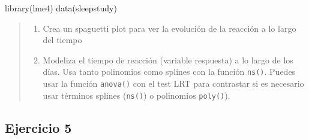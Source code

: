 \documentclass[
]{book}
\newenvironment{Shaded}{\begin{snugshade}}{\end{snugshade}}
\newcommand{\FunctionTok}[1]{\textcolor[rgb]{0.00,0.00,0.00}{#1}}
\newcommand{\NormalTok}[1]{#1}
\providecommand{\tightlist}{%
  \setlength{\itemsep}{0pt}\setlength{\parskip}{0pt}}
\begin{document}
\begin{Shaded}
\begin{Highlighting}[]
\FunctionTok{library}\NormalTok{(lme4)}
\FunctionTok{data}\NormalTok{(sleepstudy)}
\end{Highlighting}
\end{Shaded}

\begin{quote}
\begin{enumerate}
\def\labelenumi{\arabic{enumi}.}
\tightlist
\item
  Crea un spaguetti plot para ver la evolución de la reacción a lo largo del tiempo
\item
  Modeliza el tiempo de reacción (variable respuesta) a lo largo de los días. Usa tanto polinomios como splines con la función \texttt{ns()}. Puedes usar la función \texttt{anova()} con el test LRT para contrastar si es necesario usar términos splines (\texttt{ns()}) o polinomios \texttt{poly()}).
\end{enumerate}
\end{quote}

\hypertarget{ejercicio-5}{%
\subsection{Ejercicio 5}\label{ejercicio-5}}
\end{document}
